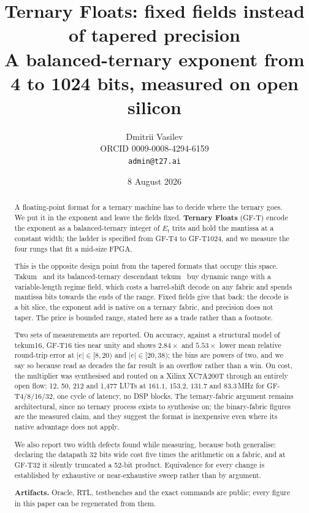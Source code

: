 \documentclass[11pt]{article}
\title{Ternary Floats: fixed fields instead of tapered precision \\
  \large A balanced-ternary exponent from 4 to 1024 bits, measured on open silicon}
\author{Dmitrii Vasilev\\
  \small ORCID 0009-0008-4294-6159 \\
  \small \texttt{admin@t27.ai}}
\date{8 August 2026}
\begin{document}
\maketitle

\begin{abstract}
A floating-point format for a ternary machine has to decide where the ternary
goes. We put it in the exponent and leave the fields fixed. \textbf{Ternary
Floats} (GF-T) encode the exponent as a balanced-ternary integer of $E_t$ trits
and hold the mantissa at a constant width; the ladder is specified from GF-T4 to
GF-T1024, and we measure the four rungs that fit a mid-size FPGA.

This is the opposite design point from the tapered formats that occupy this
space. Takum~\cite{takum} and its balanced-ternary descendant tekum~\cite{tekum}
buy dynamic range with a variable-length regime field, which costs a barrel-shift
decode on any fabric and spends mantissa bits towards the ends of the range.
Fixed fields give that back: the decode is a bit slice, the exponent add is
native on a ternary fabric, and precision does not taper. The price is bounded
range, stated here as a trade rather than a footnote.

Two sets of measurements are reported. On accuracy, against a structural model of
tekum16, GF-T16 ties near unity and shows $2.84\times$ and $5.53\times$ lower
mean relative round-trip error at $|e|\in[8,20)$ and $|e|\in[20,38)$; the bins
are powers of two, and we say so because read as decades the far result is an
overflow rather than a win. On cost, the multiplier was synthesised and routed on
a Xilinx XC7A200T through an entirely open flow: 12, 50, 212 and 1{,}477 LUTs at
$161.1$, $153.2$, $131.7$ and $83.3$\,MHz for GF-T4/8/16/32, one cycle of
latency, no DSP blocks. The ternary-fabric argument remains architectural, since no ternary
process exists to synthesise on; the binary-fabric figures are the measured
claim, and they suggest the format is inexpensive even where its native
advantage does not apply.

We also report two width defects found while measuring, because both generalise:
declaring the datapath 32 bits wide cost five times the arithmetic on a fabric,
and at GF-T32 it silently truncated a 52-bit product. Equivalence for every
change is established by exhaustive or near-exhaustive sweep rather than by
argument.

\medskip
\noindent\textbf{Artifacts.} Oracle, RTL, testbenches and the exact commands are
public; every figure in this paper can be regenerated from them.
\end{abstract}
\end{document}

